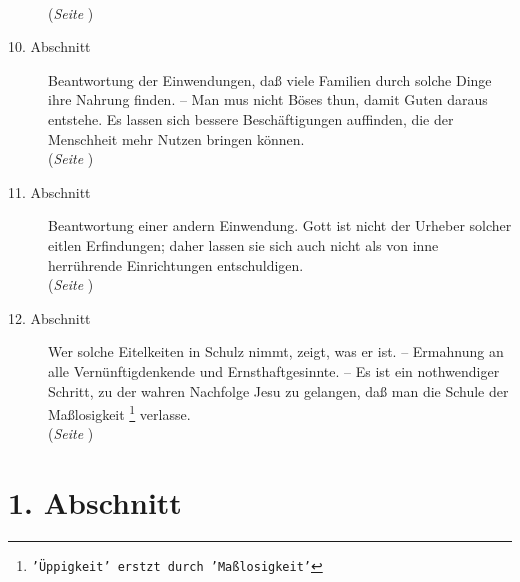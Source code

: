 \begin{description}
\\(\textit{Seite \pageref{kap17_ab9}})
\item[10. Abschnitt] Beantwortung der Einwendungen, daß viele Familien durch
solche Dinge ihre Nahrung finden. -- Man mus nicht Böses thun, damit Guten
daraus entstehe. Es lassen sich bessere Beschäftigungen auffinden, die der
Menschheit mehr Nutzen bringen können.
\\(\textit{Seite \pageref{kap17_ab10}})
\item[11. Abschnitt] Beantwortung einer andern Einwendung. Gott ist nicht der
Urheber solcher eitlen Erfindungen; daher lassen sie sich auch nicht als von
inne herrührende Einrichtungen entschuldigen.
\\(\textit{Seite \pageref{kap17_ab11}})
\item[12. Abschnitt] Wer solche Eitelkeiten in Schulz nimmt, zeigt, was er ist.
-- Ermahnung an alle Vernünftigdenkende und Ernsthaftgesinnte. -- Es ist ein
nothwendiger Schritt, zu der wahren Nachfolge Jesu zu gelangen, daß man die
Schule der Maßlosigkeit
\footnote{\texttt{'Üppigkeit' erstzt durch 'Maßlosigkeit'}}
verlasse.
\\(\textit{Seite \pageref{kap17_ab12}})

\end{description}

\newpage

\section{1. Abschnitt} \label{kap17_ab1}


